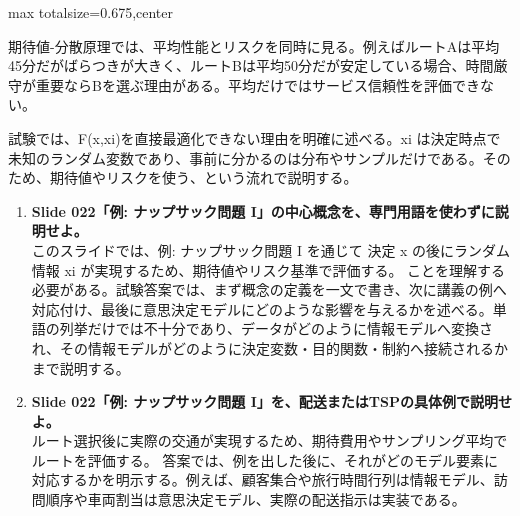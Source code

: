 \begin{adjustbox}{max totalsize={\textwidth}{0.675\textheight},center}
\begin{minipage}{\textwidth}
\begin{minipage}[t]{0.485\textwidth}
期待値-分散原理では、平均性能とリスクを同時に見る。例えばルートAは平均45分だがばらつきが大きく、ルートBは平均50分だが安定している場合、時間厳守が重要ならBを選ぶ理由がある。平均だけではサービス信頼性を評価できない。\par
試験では、F(x,xi)を直接最適化できない理由を明確に述べる。xi は決定時点で未知のランダム変数であり、事前に分かるのは分布やサンプルだけである。そのため、期待値やリスクを使う、という流れで説明する。\par
{}
\begin{enumerate}
\item \textbf{Slide 022「例: ナップサック問題 I」の中心概念を、専門用語を使わずに説明せよ。}\\このスライドでは、例: ナップサック問題 I を通じて 決定 x の後にランダム情報 xi が実現するため、期待値やリスク基準で評価する。 ことを理解する必要がある。試験答案では、まず概念の定義を一文で書き、次に講義の例へ対応付け、最後に意思決定モデルにどのような影響を与えるかを述べる。単語の列挙だけでは不十分であり、データがどのように情報モデルへ変換され、その情報モデルがどのように決定変数・目的関数・制約へ接続されるかまで説明する。
\item \textbf{Slide 022「例: ナップサック問題 I」を、配送またはTSPの具体例で説明せよ。}\\ルート選択後に実際の交通が実現するため、期待費用やサンプリング平均でルートを評価する。 答案では、例を出した後に、それがどのモデル要素に対応するかを明示する。例えば、顧客集合や旅行時間行列は情報モデル、訪問順序や車両割当は意思決定モデル、実際の配送指示は実装である。
\end{enumerate}
\end{minipage}
\end{minipage}
\end{adjustbox}


